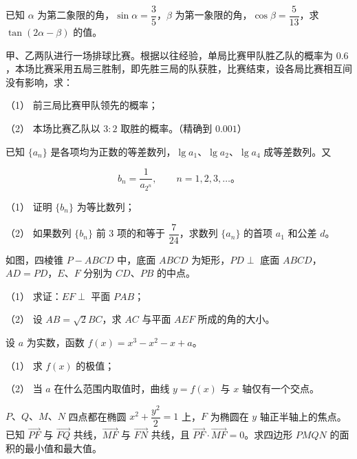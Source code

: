 \begin{question}
已知 $\alpha$ 为第二象限的角，$\sin\alpha=\dfrac35$，$\beta$ 为第一象限的角，$\cos\beta=\dfrac5{13}$，求 $\tan(2\alpha-\beta)$ 的值。

\end{question}
\begin{question}
甲、乙两队进行一场排球比赛。根据以往经验，单局比赛甲队胜乙队的概率为 $0.6$，本场比赛采用五局三胜制，即先胜三局的队获胜，比赛结束，设各局比赛相互间没有影响，求：

（1） 前三局比赛甲队领先的概率；

（2） 本场比赛乙队以 $3:2$ 取胜的概率。（精确到 $0.001$）

\end{question}
\begin{question}
已知 $\{a_n\}$ 是各项均为正数的等差数列，$\lg a_1\text{、}\lg a_2\text{、}\lg a_4$ 成等差数列。又

\nopagebreak[4]
\[
b_n=\frac1{a_{2^n}},\qquad n=1,2,3,\ldots\text{。}
\]

（1） 证明 $\{b_n\}$ 为等比数列；

（2） 如果数列 $\{b_n\}$ 前 $3$ 项的和等于 $\dfrac7{24}$，求数列 $\{a_n\}$ 的首项 $a_1$ 和公差 $d$。

\Needspace{0.4\textheight}
\end{question}
\begin{question}
如图，四棱锥 $P-ABCD$ 中，底面 $ABCD$ 为矩形，$PD\perp$ 底面 $ABCD$，$AD=PD$，$E\text{、}F$ 分别为 $CD\text{、}PB$ 的中点。
\nopagebreak[4]
\begin{center}\end{center}
\nopagebreak[4]
（1） 求证：$EF\perp$ 平面 $PAB$；

（2） 设 $AB=\sqrt2BC$，求 $AC$ 与平面 $AEF$ 所成的角的大小。

\end{question}
\begin{question}
设 $a$ 为实数，函数 $f(x)=x^3-x^2-x+a$。

（1） 求 $f(x)$ 的极值；

（2） 当 $a$ 在什么范围内取值时，曲线 $y=f(x)$ 与 $x$ 轴仅有一个交点。

\end{question}
\begin{question}
$P\text{、}Q\text{、}M\text{、}N$ 四点都在椭圆 $x^2+\dfrac{y^2}{2}=1$ 上，$F$ 为椭圆在 $y$ 轴正半轴上的焦点。已知 $\overrightarrow{PF}$ 与 $\overrightarrow{FQ}$ 共线，$\overrightarrow{MF}$ 与 $\overrightarrow{FN}$ 共线，且 $\overrightarrow{PF}\cdot\overrightarrow{MF}=0$。求四边形 $PMQN$ 的面积的最小值和最大值。

\end{question}